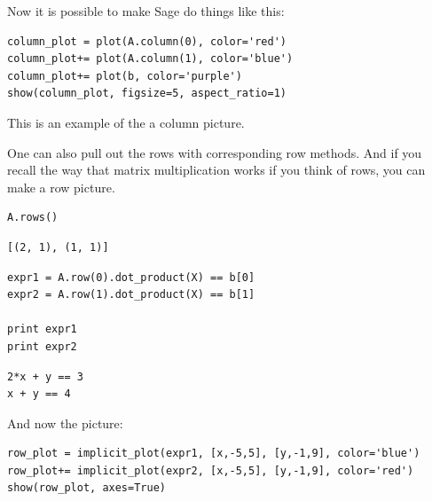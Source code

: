 \documentclass[10pt,]{book}
\theoremstyle{plain}
\theoremstyle{definition}
\numberwithin{equation}{section}
\begin{document}
      Now it is possible to make Sage do things like this:
\begin{lstlisting}[style=sageinput]
column_plot = plot(A.column(0), color='red')
column_plot+= plot(A.column(1), color='blue')
column_plot+= plot(b, color='purple')
show(column_plot, figsize=5, aspect_ratio=1)
\end{lstlisting}
\par

      This is an example of the a column picture.
\par

      One can also pull out the rows with corresponding row methods. And if you
      recall the way that matrix multiplication works if you think of rows, you
      can make a row picture.
\begin{lstlisting}[style=sageinput]
A.rows()
\end{lstlisting}
\begin{lstlisting}[style=sageoutput]
[(2, 1), (1, 1)]
\end{lstlisting}
\begin{lstlisting}[style=sageinput]
expr1 = A.row(0).dot_product(X) == b[0]
expr2 = A.row(1).dot_product(X) == b[1]

print expr1
print expr2
\end{lstlisting}
\begin{lstlisting}[style=sageoutput]
2*x + y == 3
x + y == 4
\end{lstlisting}
\par

      And now the picture:
\begin{lstlisting}[style=sageinput]
row_plot = implicit_plot(expr1, [x,-5,5], [y,-1,9], color='blue')
row_plot+= implicit_plot(expr2, [x,-5,5], [y,-1,9], color='red')
show(row_plot, axes=True)
\end{lstlisting}
\typeout{************************************************}
\typeout{************************************************}
\end{document}
